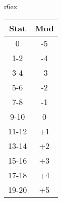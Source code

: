 
\begin{wraptable}[9]{r}{6ex}
  \small
\vspace*{-8ex}
\hspace*{-4.5ex}
\begin{tabular}{cc}
  Stat  & Mod \\
  \hline
  0     & -5       \\
  1-2   & -4       \\
  3-4   & -3       \\
  5-6   & -2       \\
  7-8   & -1       \\
  9-10  &  0       \\
  11-12 & +1       \\
  13-14 & +2       \\
  15-16 & +3       \\
  17-18 & +4       \\
  19-20 & +5
\end{tabular}
\end{wraptable}
